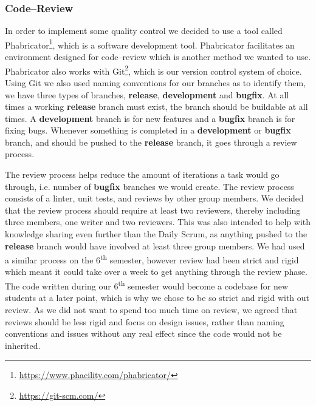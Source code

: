 \subsubsection{Code--Review}
In order to implement some quality control we decided to use a tool called Phabricator\footnote{\url{https://www.phacility.com/phabricator/}}, which is a software development tool.
Phabricator facilitates an environment designed for code--review which is another method we wanted to use.
Phabricator also works with Git\footnote{\url{https://git-scm.com/}}, which is our version control system of choice.
Using Git we also used naming conventions for our branches as to identify them, we have three types of branches, \textbf{release}, \textbf{development} and \textbf{bugfix}.
At all times a working \textbf{release} branch must exist, the branch should be buildable at all times.
A \textbf{development} branch is for new features and a \textbf{bugfix} branch is for fixing bugs.
Whenever something is completed in a \textbf{development} or \textbf{bugfix} branch, and should be pushed to the \textbf{release} branch, it goes through a review process.

The review process helps reduce the amount of iterations a task would go through, i.e. number of \textbf{bugfix} branches we would create.
The review process consists of a linter, unit tests, and reviews by other group members.
We decided that the review process should require at least two reviewers, thereby including three members, one writer and two reviewers.
This was also intended to help with knowledge sharing even further than the Daily Scrum, as anything pushed to the \textbf{release} branch would have involved at least three group members.
We had used a similar process on the 6\textsuperscript{th} semester, however review had been strict and rigid which meant it could take over a week to get anything through the review phase.
The code written during our 6\textsuperscript{th} semester would become a codebase for new students at a later point, which is why we chose to be so strict and rigid with out review.
As we did not want to spend too much time on review, we agreed that reviews should be less rigid and focus on design issues, rather than naming conventions and issues without any real effect since the code would not be inherited.
